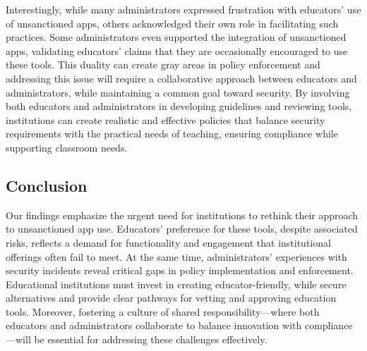 Interestingly, while many administrators expressed frustration with educators' use of unsanctioned apps, others acknowledged their own role in facilitating such practices. 
Some administrators even supported the integration of unsanctioned apps, validating educators' claims that they are occasionally encouraged to use these tools. 
This duality can create gray areas in policy enforcement and addressing this issue will require a collaborative approach between educators and administrators, while maintaining a common goal toward security.
By involving both educators and administrators in developing guidelines and reviewing tools, institutions can create realistic and effective policies that balance security requirements with the practical needs of teaching, ensuring compliance while supporting classroom needs.

\subsection{Conclusion}
Our findings emphasize the urgent need for institutions to rethink their approach to unsanctioned app use. 
Educators' preference for these tools, despite associated risks, reflects a demand for functionality and engagement that institutional offerings often fail to meet. 
At the same time, administrators' experiences with security incidents reveal critical gaps in policy implementation and enforcement. 
Educational institutions must invest in creating educator-friendly, while secure alternatives and provide clear pathways for vetting and approving education tools. 
Moreover, fostering a culture of shared responsibility---where both educators and administrators collaborate to balance innovation with compliance---will be essential for addressing these challenges effectively.